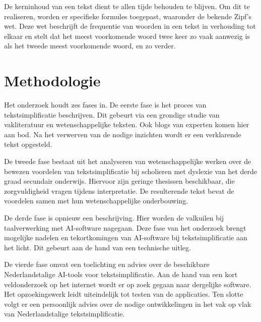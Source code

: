 De kerninhoud van een tekst dient te allen tijde behouden te blijven. Om dit te realiseren, worden er specifieke formules toegepast, waaronder de bekende Zipf's wet. Deze wet beschrijft de frequentie van woorden in een tekst in verhouding tot elkaar en stelt dat het meest voorkomende woord twee keer zo vaak aanwezig is als het tweede meest voorkomende woord, en zo verder.





\section{Methodologie}%
\label{sec:methodologie}

Het onderzoek houdt zes fases in. De eerste fase is het proces van tekstsimplificatie beschrijven. Dit gebeurt via een grondige studie van vakliteratuur en wetenschappelijke teksten. Ook blogs van experten komen hier aan bod. Na het verwerven van de nodige inzichten wordt er een verklarende tekst opgesteld.

De tweede fase bestaat uit het analyseren van wetenschappelijke werken over de bewezen voordelen van tekstsimplificatie bij scholieren met dyslexie van het derde graad secundair onderwijs. Hiervoor zijn geringe thesissen beschikbaar, die zorgvuldigheid vragen tijdens interpretatie. De resulterende tekst bevat de voordelen samen met hun wetenschappelijke onderbouwing.

De derde fase is opnieuw een beschrijving. Hier worden de valkuilen bij taalverwerking met AI-software nagegaan. Deze fase van het onderzoek brengt mogelijke nadelen en tekortkomingen van AI-software bij tekstsimplificatie aan het licht. Dit gebeurt aan de hand van een technische uitleg.

De vierde fase omvat een toelichting en advies over de beschikbare Nederlandstalige AI-tools voor tekstsimplificatie. Aan de hand van een kort veldonderzoek op het internet wordt er op zoek gegaan naar dergelijke software. Het opzoekingswerk leidt uiteindelijk tot testen van de applicaties. Ten slotte volgt er een persoonlijk advies over de nodige ontwikkelingen in het vak op vlak van Nederlandstalige tekstsimplificatie.

